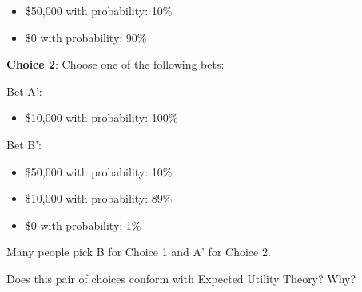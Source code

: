 \documentclass[
  letterpaper,
  DIV=11,
  numbers=noendperiod]{scrreprt}
\providecommand{\tightlist}{%
  \setlength{\itemsep}{0pt}\setlength{\parskip}{0pt}}\usepackage{longtable,booktabs,array}
\begin{document}
\begin{itemize}
\tightlist
\item
  \$50,000 with probability: 10\%
\item
  \$0 with probability: 90\%
\end{itemize}

\textbf{Choice 2}: Choose one of the following bets:

Bet A':

\begin{itemize}
\tightlist
\item
  \$10,000 with probability: 100\%
\end{itemize}

Bet B':

\begin{itemize}
\tightlist
\item
  \$50,000 with probability: 10\%
\item
  \$10,000 with probability: 89\%
\item
  \$0 with probability: 1\%
\end{itemize}

Many people pick B for Choice 1 and A' for Choice 2.

Does this pair of choices conform with Expected Utility Theory? Why?
\end{document}
